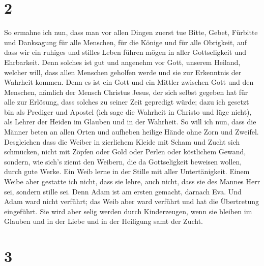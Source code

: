 \hypertarget{section-1}{%
\section{2}\label{section-1}}

 So ermahne ich nun, dass man vor allen Dingen zuerst tue
Bitte, Gebet, Fürbitte und Danksagung für alle Menschen, 
für die Könige und für alle Obrigkeit, auf dass wir ein ruhiges und
stilles Leben führen mögen in aller Gottseligkeit und Ehrbarkeit.
 Denn solches ist gut und angenehm vor Gott, unserem
Heiland,  welcher will, dass allen Menschen geholfen werde
und sie zur Erkenntnis der Wahrheit kommen.  Denn es ist
ein Gott und ein Mittler zwischen Gott und den Menschen, nämlich der
Mensch Christus Jesus,  der sich selbst gegeben hat für
alle zur Erlösung, dass solches zu seiner Zeit gepredigt würde;
 dazu ich gesetzt bin als Prediger und Apostel (ich sage
die Wahrheit in Christo und lüge nicht), als Lehrer der Heiden im
Glauben und in der Wahrheit.  So will ich nun, dass die
Männer beten an allen Orten und aufheben heilige Hände ohne Zorn und
Zweifel.  Desgleichen dass die Weiber in zierlichem Kleide
mit Scham und Zucht sich schmücken, nicht mit Zöpfen oder Gold oder
Perlen oder köstlichem Gewand,  sondern, wie sich's ziemt
den Weibern, die da Gottseligkeit beweisen wollen, durch gute Werke.
 Ein Weib lerne in der Stille mit aller Untertänigkeit.
 Einem Weibe aber gestatte ich nicht, dass sie lehre,
auch nicht, dass sie des Mannes Herr sei, sondern stille sei.
 Denn Adam ist am ersten gemacht, darnach Eva.
 Und Adam ward nicht verführt; das Weib aber ward
verführt und hat die Übertretung eingeführt.  Sie wird
aber selig werden durch Kinderzeugen, wenn sie bleiben im Glauben und in
der Liebe und in der Heiligung samt der Zucht.

\hypertarget{section-2}{%
\section{3}\label{section-2}}

